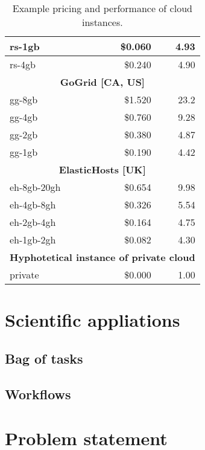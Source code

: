 \begin{table}
\begin{tabular}{| l | r | r |}
    rs-1gb            & \$0.060   & 4.93                                     \\ \hline
    rs-4gb            & \$0.240   & 4.90                                     \\ \hline
    \multicolumn{3}{|c|}{\textbf{GoGrid [CA, US]}}                           \\ \hline
    gg-8gb            & \$1.520   & 23.2                                     \\ \hline
    gg-4gb            & \$0.760   & 9.28                                     \\ \hline
    gg-2gb            & \$0.380   & 4.87                                     \\ \hline
    gg-1gb            & \$0.190   & 4.42                                     \\ \hline
    \multicolumn{3}{|c|}{\textbf{ElasticHosts [UK]}}                         \\ \hline
    eh-8gb-20gh       & \$0.654   & 9.98                                     \\ \hline
    eh-4gb-8gh        & \$0.326   & 5.54                                     \\ \hline
    eh-2gb-4gh        & \$0.164   & 4.75                                     \\ \hline
    eh-1gb-2gh        & \$0.082   & 4.30                                     \\ \hline
    \multicolumn{3}{|c|}{\textbf{Hyphotetical instance of private cloud}}    \\ \hline
    private           & \$0.000   & 1.00                                     \\ \hline
  \end{tabular}
  \caption{Example pricing and performance of cloud instances.}
  \label{table:intro:cloud:pricing}  
\end{table}

\section{Scientific appliations}



\subsection{Bag of tasks}

\subsection{Workflows}

\section{Problem statement}

